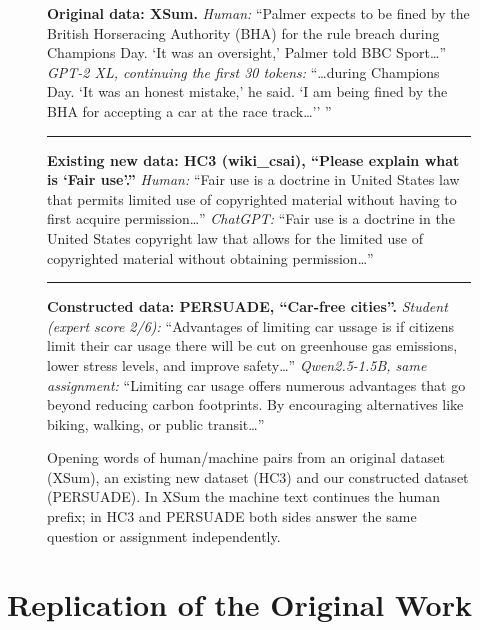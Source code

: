 \documentclass[11pt]{article}
\begin{document}
\begin{figure}[t]
\small
\begin{tcolorbox}[colback=gray!5,colframe=gray!50,boxsep=1pt,left=2pt,right=2pt,top=1pt,bottom=1pt]
\textbf{Original data: XSum.} \emph{Human:} ``Palmer expects to be fined by the British Horseracing Authority (BHA) for the rule breach during Champions Day. `It was an oversight,' Palmer told BBC Sport\ldots'' \emph{GPT-2 XL, continuing the first 30 tokens:} ``\ldots during Champions Day. `It was an honest mistake,' he said. `I am being fined by the BHA for accepting a car at the race track\ldots'' ''\\[2pt]
\hrule\vspace{2pt}
\textbf{Existing new data: HC3 (wiki\_csai), ``Please explain what is `Fair use'.''} \emph{Human:} ``Fair use is a doctrine in United States law that permits limited use of copyrighted material without having to first acquire permission\ldots'' \emph{ChatGPT:} ``Fair use is a doctrine in the United States copyright law that allows for the limited use of copyrighted material without obtaining permission\ldots''\\[2pt]
\hrule\vspace{2pt}
\textbf{Constructed data: PERSUADE, ``Car-free cities''.} \emph{Student (expert score 2/6):} ``Advantages of limiting car ussage is if citizens limit their car usage there will be cut on greenhouse gas emissions, lower stress levels, and improve safety\ldots'' \emph{Qwen2.5-1.5B, same assignment:} ``Limiting car usage offers numerous advantages that go beyond reducing carbon footprints. By encouraging alternatives like biking, walking, or public transit\ldots''
\end{tcolorbox}
\caption{Opening words of human/machine pairs from an original dataset (XSum), an existing new dataset (HC3) and our constructed dataset (PERSUADE). In XSum the machine text continues the human prefix; in HC3 and PERSUADE both sides answer the same question or assignment independently.}
\label{fig:snippets}
\end{figure}

\section{Replication of the Original Work}
\label{sec:replication}
\end{document}
